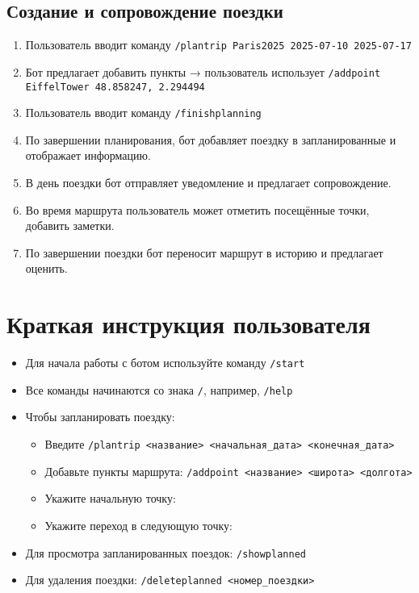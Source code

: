 \documentclass[areasetadvanced]{scrartcl}
\begin{document}
\subsection{Создание и сопровождение поездки}
\begin{enumerate}
  \item Пользователь вводит команду \texttt{/plantrip Paris2025 2025-07-10 2025-07-17}
  \item Бот предлагает добавить пункты → пользователь использует \texttt{/addpoint EiffelTower 48.858247, 2.294494}
        \item Пользователь вводит команду \texttt{/finishplanning}
  \item По завершении планирования, бот добавляет поездку в запланированные и отображает информацию.
  \item В день поездки бот отправляет уведомление и предлагает сопровождение.
  \item Во время маршрута пользователь может отметить посещённые точки, добавить заметки.
  \item По завершении поездки бот переносит маршрут в историю и предлагает оценить.
\end{enumerate}
\newpage
\section{Краткая инструкция пользователя}
\begin{itemize}
  \item Для начала работы с ботом используйте команду \texttt{/start}
  \item Все команды начинаются со знака \texttt{/}, например, \texttt{/help}
  \item Чтобы запланировать поездку: \begin{itemize}
    \item Введите \texttt{/plantrip <название> <начальная\_дата> <конечная\_дата>}
    \item Добавьте пункты маршрута: \texttt{/addpoint <название> <широта> <долгота>}
            \item Укажите начальную точку: 
            \item Укажите переход в следующую точку: 
  \end{itemize}
  \item Для просмотра запланированных поездок: \texttt{/showplanned}
  \item Для удаления поездки: \texttt{/deleteplanned <номер\_поездки>}
\end{itemize}
\end{document}
